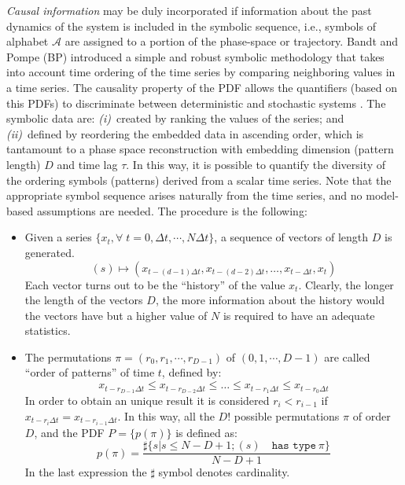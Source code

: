 {\it Causal information\/}  may be duly incorporated if information about the past dynamics of the system is included in the symbolic sequence, i.e., symbols of alphabet $\mathcal{A}$ are assigned to a portion of the phase-space or trajectory.
Bandt and Pompe (BP)\cite{Bandt2002} introduced a simple and robust symbolic methodology that takes into account time ordering of the time series by comparing neighboring values in a time series.
The causality property of the PDF allows the quantifiers (based on this PDFs) to discriminate between deterministic and stochastic systems \cite{Rosso2007B}.
The symbolic data are:
{\it (i)\/}~created by ranking the values of the series; and
{\it (ii)\/}~defined by reordering the embedded data in ascending order, which is tantamount to a phase space reconstruction with embedding dimension (pattern length) $D$ and time lag $\tau$.
In this way, it is possible to quantify the diversity of the ordering symbols (patterns) derived from a scalar time series.
Note that the appropriate symbol sequence arises naturally from the time series, and no model-based assumptions 
are needed.
The procedure is the following:
\begin{itemize}
	\item Given a series $\{x_t, \forall \;  t=0, \Delta t, \cdots,N\Delta t \}$, a sequence of vectors of length $D$ is generated.
		\begin{equation}
		(s)\longmapsto\left(x_{t-(d-1)\Delta t},x_{t-(d-2)\Delta t},\dots,x_{t-\Delta t},x_{t}\right) 
		\label{eq:vectores}
		\end{equation}
		Each vector turns out to be the ``history'' of the value $x_t$. Clearly, the longer the length of the vectors $D$, the more information about the history would the vectors have but a higher value of $N$ is required to have an adequate statistics. 
	\item The permutations $\pi=(r_0, r_1, \cdots, r_{D-1})$ of $(0, 1, \cdots, D-1)$ are called ``order of patterns'' of time $t$, defined by:
		\begin{equation}
		\label{eq:permuta}
		x_{t-r_{D-1}\Delta t}\le x_{t-r_{D-2}\Delta t}\le\dots\le x_{t-r_{1}\Delta t}\le x_{t-r_0\Delta t}
		\end{equation}
		In order to obtain an unique result it is considered $r_i<r_{i-1}$ if $x_{t-r_{i}\Delta t}=x_{t-r_{i-1}\Delta t}$.
		In this way, all the $D!$ possible permutations $\pi$ of order $D$, and the PDF $P=\{p(\pi)\}$ is defined as:
		\begin{equation}
		\label{eq:frequ}
		p(\pi)=\frac{\sharp \{s|s\leq N-D+1; (s) \quad \texttt{has type}~\pi\}}{N-D+1}
		\end{equation}
		In the last expression the $\sharp$ symbol denotes cardinality.
\end{itemize}
